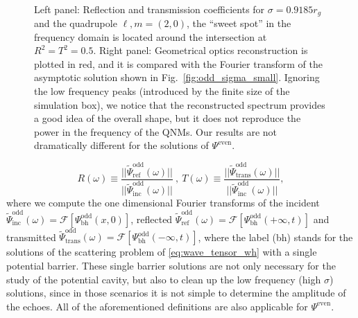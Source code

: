 \documentclass[article,aps,nofootinbib,twocolumn,superscriptaddress]{revtex4-1}
\begin{document}
\begin{figure}[t!]
\centering
{} \,
\caption{\label{fig:RT_reconst} Left panel: Reflection and transmission coefficients for $\sigma=0.9185r_g$ and the quadrupole $\ell,m=(2,0)$, the ``sweet spot'' in the frequency domain is located around the intersection at $R^2=T^2=0.5$. Right panel: Geometrical optics reconstruction is plotted in red, and it is compared with the Fourier transform of the asymptotic solution shown in Fig.~\ref{fig:odd_sigma_small}. Ignoring the low frequency peaks (introduced by the finite size of the simulation box), we notice that the reconstructed spectrum provides a good idea of the overall shape, but it does not reproduce the power in the frequency of the QNMs. Our results are not dramatically different for the solutions of $\Psi^{\mathrm{even}}$.} 
\end{figure}

\begin{equation}
R(\omega)\equiv \frac{||\tilde{\Psi}_{\mathrm{ref}}^{\mathrm{odd}}(\omega)||}{||\tilde{\Psi}_{\mathrm{inc}}^{\mathrm{odd}}(\omega)||}~,~T(\omega)\equiv  \frac{||\tilde{\Psi}_{\mathrm{trans}}^{\mathrm{odd}}(\omega)||}{||\tilde{\Psi}_{\mathrm{inc}}^{\mathrm{odd}}(\omega)||},
\label{eq:odd_ref_and_trans}
\end{equation}
where we compute the one dimensional Fourier transforms of the incident $\tilde{\Psi}_{\mathrm{inc}}^{\mathrm{odd}}(\omega)=\mathcal{F}[\Psi^{\mathrm{odd}}_{\mathrm{bh}}(x,0)]$, reflected $\tilde{\Psi}_{\mathrm{ref}}^{\mathrm{odd}}(\omega)=\mathcal{F}[\Psi^{\mathrm{odd}}_{\mathrm{bh}}(+\infty,t)]$ and transmitted $\tilde{\Psi}_{\mathrm{trans}}^{\mathrm{odd}}(\omega)=\mathcal{F}[\Psi^{\mathrm{odd}}_{\mathrm{bh}}(-\infty,t)]$, where the label (bh) stands for the solutions of the scattering problem of \eqref{eq:wave_tensor_wh} with a single potential barrier. These single barrier solutions are not only necessary for the study of the potential cavity, but also to clean up the low frequency (high $\sigma$) solutions, since in those scenarios it is not simple to determine the amplitude of the echoes. All of the aforementioned definitions are also applicable for $\Psi^{\mathrm{even}}$. 
\end{document}

